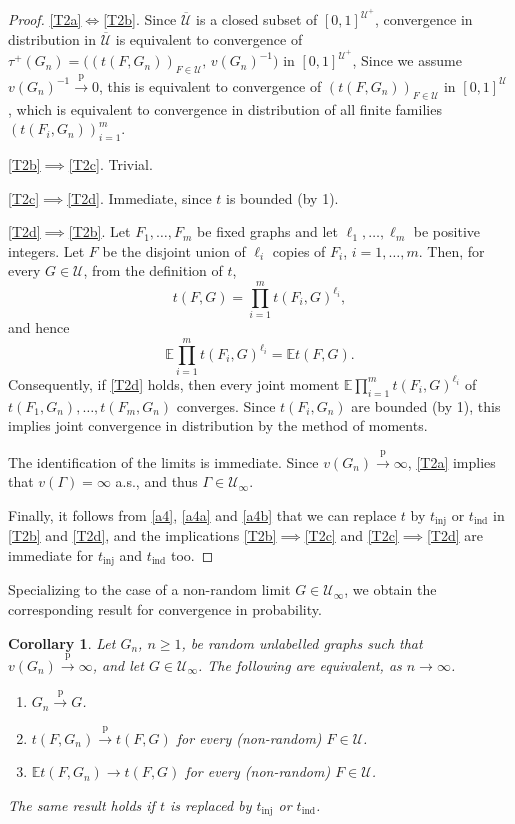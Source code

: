 \documentclass[11pt,reqno,tbtags]{amsart}
\numberwithin{equation}{section}
\newtheorem{corollary}[theorem]{Corollary}
\theoremstyle{definition}
\theoremstyle{remark}
\newenvironment{romenumerate}{\begin{enumerate}%
 \renewcommand{\labelenumi}{\textup{(\roman{enumi})}}%
 \renewcommand{\theenumi}{\textup{(\roman{enumi})}}%
 }{\end{enumerate}}
\newcommand\bigpar[1]{\bigl(#1\bigr)}
\newcommand\ntoo{\ensuremath{{n\to\infty}}}
\newcommand{\tend}{\longrightarrow}
\newcommand\pto{\overset{\mathrm{p}}{\tend}}
\newcommand\E{\operatorname{\mathbb E{}}}
\newcommand\gG{\Gamma}
\newcommand\cU{{\mathcal U}}
\newcommand\qw{^{-1}}
\renewcommand{\=}{:=}
\newcommand\oi{[0,1]}
\newcommand{\tinj}{t_{\mathrm{inj}}}
\newcommand{\tind}{t_{\mathrm{ind}}}
\newcommand{\cuq}{\overline{\cU}}
\newcommand{\cuu}{\cU^+}
\newcommand{\cuoo}{\cU_\infty}
\newcommand{\oiu}{\oi^{\cU}}
\newcommand{\oiuu}{\oi^{\cuu}}
\newcommand{\tauu}{\tau^+}
\begin{document}
\begin{proof}
  \ref{T2a}$\iff$\ref{T2b}.
Since $\cuq$ is a closed subset of $\oiuu$, convergence in
distribution in $\cuq$ is equivalent to convergence of
$\tauu(G_n)=\bigpar{(t(F,G_n))_{F\in\cU},\,v(G_n)\qw}$ in $\oiuu$,
Since we assume $v(G_n)\qw\pto0$, this is equivalent to convergence of
$(t(F,G_n))_{F\in\cU}$ in $\oiu$ \cite[Theorem 4.4]{Bill},
which is equivalent to convergence in distribution of all finite
families $(t(F_i,G_n))_{i=1}^m$.

  \ref{T2b}$\implies$\ref{T2c}. Trivial.

  \ref{T2c}$\implies$\ref{T2d}. Immediate, since $t$ is
  bounded (by 1).

  \ref{T2d}$\implies$\ref{T2b}.
Let $F_1,\dots,F_m$ be fixed graphs and let $\ell_1,\dots,\ell_m$ be
positive integers. Let $F$ be the disjoint union of $\ell_i$ copies of
$F_i$, $i=1,\dots,m$. Then, for every $G\in\cU$, from the definition
of $t$,
\begin{equation*}
  t(F,G)=\prod_{i=1}^mt(F_i,G)^{\ell_i},
\end{equation*}
and hence
\begin{equation}\label{b3}
\E\prod_{i=1}^mt(F_i,G)^{\ell_i}
=\E  t(F,G).
\end{equation}
Consequently, if \ref{T2d} holds, then every joint moment
$\E\prod_{i=1}^mt(F_i,G)^{\ell_i}$ of 
$t(F_1,G_n),\dots,t(F_m,G_n)$ converges. Since $t(F_i,G_n)$ are
bounded (by 1), this implies joint convergence in distribution by the
method of moments.

The identification of the limits is immediate.
Since $v(G_n)\pto\infty$, \ref{T2a} implies that $v(\gG)=\infty$ a.s.,
and thus $\gG\in\cuoo$.

Finally, it follows from \eqref{a4}, \eqref{a4a} and \eqref{a4b} that
we can replace $t$ by $\tinj$ or $\tind$ in \ref{T2b} and \ref{T2d},
and the implications
\ref{T2b}$\implies$\ref{T2c} and \ref{T2c}$\implies$\ref{T2d} are
immediate for $\tinj$ and $\tind$ too.
\end{proof}

Specializing to the case of a non-random limit $G\in\cuoo$, we obtain the
corresponding result for convergence in probability.

\begin{corollary}
  \label{C2}
Let $G_n$, $n\ge1$, be random unlabelled graphs such that
$v(G_n)\pto\infty$, and let $G\in\cuoo$.
The following are equivalent, as \ntoo.
\begin{romenumerate}
  \item\label{C2a}
$G_n\pto G$.
  \item\label{C2c}
$t(F,G_n)\pto t(F,G)$ for every (non-random) $F\in\cU$.
  \item\label{C2d}
$\E t(F,G_n)\to t(F,G)$ for every (non-random) $F\in\cU$.
\end{romenumerate}

The same result holds if $t$ is replaced by $\tinj$ or $\tind$.
\end{corollary}
\end{document}
